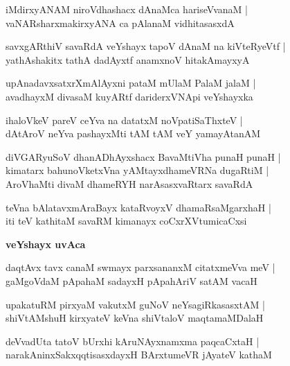 \documentclass[twoside,12pt,openright]{book}
\newcounter{shloka}[chapter]
\def\uvaca#1{\centerline{{\large\textbf{#1}}}}
\begin{document}
\begin{shloka}
iMdirxyANAM niroVdhashacx dAnaMca hariseVvanaM |\\
vaNARsharxmakirxyANA ca pAlanaM vidhitasasxdA 
\end{shloka}

\begin{shloka}
savxgARthiV savaRdA veYshayx tapoV dAnaM na kiVteRyeVtf |\\
yathAshakitx tathA dadAyxtf anamxnoV hitakAmayxyA 
\end{shloka}

\begin{shloka}
upAnadavxsatxrXmAlAyxni pataM mUlaM PalaM jalaM |\\
avadhayxM divasaM kuyARtf dariderxVNApi veYshayxka
\end{shloka}

\begin{shloka}
ihaloVkeV pareV ceYva  na datatxM noVpatiSaThxteV |\\
dAtAroV neYva pashayxMti tAM tAM veY yamayAtanAM 
\end{shloka}

\begin{shloka}
diVGARyuSoV dhanADhAyxshacx BavaMtiVha punaH punaH |\\
kimatarx bahunoVketxVna yAMtayxdhameVRNa dugaRtiM |\\
AroVhaMti divaM dhameRYH narAsasxvaRtarx savaRdA 
\end{shloka}

\begin{shloka}
teVna bAlatavxmAraBayx kataRvoyxV dhamaRsaMgarxhaH |\\
iti teV kathitaM savaRM kimanayx coCxrXVtumicaCxsi 
\end{shloka}

\uvaca { veYshayx uvAca }

\begin{shloka}
daqtAvx tavx canaM swmayx parxsananxM citatxmeVva meV |\\
gaMgoVdaM pApahaM sadayxH pApahAriV satAM vacaH 
\end{shloka}

\begin{shloka}
upakatuRM pirxyaM vakutxM guNoV neYsagiRkasasxtAM |\\
shiVtAMshuH kirxyateV keVna shiVtaloV maqtamaMDalaH 
\end{shloka}

\begin{shloka}
deVvadUta tatoV bUrxhi kAruNAyxnamxma paqcaCxtaH |\\
narakAninxSakxqqtisasxdayxH BArxtumeVR jAyateV kathaM 
\end{shloka}
\end{document}
